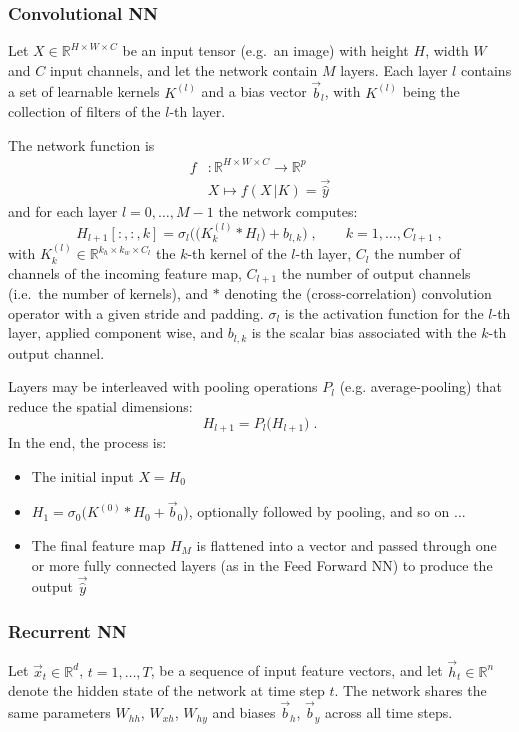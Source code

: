 \documentclass[12pt,a4paper]{article}
\begin{document}
\subsubsection*{Convolutional NN}
Let $X\in \mathbb{R}^{H\times W \times C}$ be an input tensor (e.g.\ an image) with height $H$, width $W$ and $C$ input channels, and let the network contain $M$ layers. Each layer $l$ contains a set of learnable kernels $K^{(l)}$ and a bias vector $\vec{b}_l$, with $K^{(l)}$ being the collection of filters of the $l$-th layer.

The network function is
\begin{align*}
	f &: \mathbb{R}^{H\times W \times C} \to \mathbb{R}^p\\
	&X \mapsto f(X \,| K) = \vec{\hat{y}}
\end{align*}
and for each layer $l=0,\ldots,M-1$ the network computes:
$$
H_{l+1}[:,:,k] = \sigma_l\Big(\big(K^{(l)}_k * H_l\big) + b_{l,k}\Big)\;, \qquad k=1,\ldots,C_{l+1}\;,
$$
with $K^{(l)}_k \in \mathbb{R}^{k_h \times k_w \times C_l}$ the $k$-th kernel of the $l$-th layer, $C_l$ the number of channels of the incoming feature map, $C_{l+1}$ the number of output channels (i.e.\ the number of kernels), and $*$ denoting the (cross-correlation) convolution operator with a given stride and padding. $\sigma_l$ is the activation function for the $l$-th layer, applied component wise, and $b_{l,k}$ is the scalar bias associated with the $k$-th output channel.

Layers may be interleaved with pooling operations $P_l$ (e.g. average-pooling) that reduce the spatial dimensions:
$$
H_{l+1} = P_l\big(H_{l+1}\big)\;.
$$
In the end, the process is:
\begin{itemize}
	\item[1.] The initial input $X = H_0$
	\item[2.] $H_1 = \sigma_0\big(K^{(0)} * H_0 + \vec{b}_0\big)$, optionally followed by pooling, and so on ...
	\item[3.] The final feature map $H_M$ is flattened into a vector and passed through one or more fully connected layers (as in the Feed Forward NN) to produce the output $\vec{\hat{y}}$
\end{itemize}


\subsubsection*{Recurrent NN}
Let $\vec{x}_t \in \mathbb{R}^d$, $t=1,\ldots,T$, be a sequence of input feature vectors, and let $\vec{h}_t \in \mathbb{R}^n$ denote the hidden state of the network at time step $t$. The network shares the same parameters $W_{hh}$, $W_{xh}$, $W_{hy}$ and biases $\vec{b}_h$, $\vec{b}_y$ across all time steps.
\end{document}
